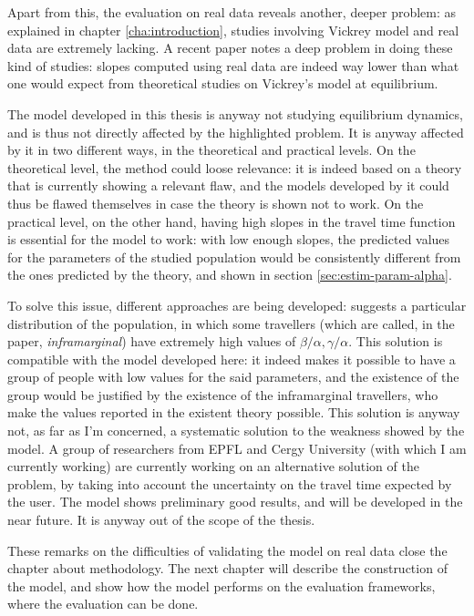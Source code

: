 Apart from this, the evaluation on real data reveals another, deeper problem:
as explained in chapter \ref{cha:introduction},
studies involving Vickrey model and real data are extremely lacking.
A recent paper \parencite{https://doi.org/10.1111/iere.12692} notes a deep problem in doing these kind of studies:
slopes computed using real data are indeed way lower than what one would expect from theoretical studies on Vickrey's model at equilibrium.

The model developed in this thesis is anyway not studying equilibrium dynamics,
and is thus not directly affected by the highlighted problem.
It is anyway affected by it in two different ways, in the theoretical and practical levels.
On the theoretical level, the method could loose relevance:
it is indeed based on a theory that is currently showing a relevant flaw,
and the models developed by it could thus be flawed themselves in case the theory is shown not to work.
On the practical level, on the other hand,
having high slopes in the travel time function is essential for the model to work:
with low enough slopes,
the predicted values for the parameters of the studied population would be consistently different from the ones predicted by the theory, and shown in section \ref{sec:estim-param-alpha}.

To solve this issue, different approaches are being developed:
\textcite{https://doi.org/10.1111/iere.12692} suggests a particular distribution of the population,
in which some travellers (which are called, in the paper, \textit{inframarginal}) have extremely high values of \(\beta/\alpha, \gamma/\alpha\).
This solution is compatible with the model developed here:
it indeed makes it possible to have a group of people with low values for the said parameters,
and the existence of the group would be justified by the existence of the inframarginal travellers,
who make the values reported in the existent theory possible.
This solution is anyway not, as far as I'm concerned,
a systematic solution to the weakness showed by the model.
A group of researchers from EPFL and Cergy University (with which I am currently working) are currently working on an alternative solution of the problem,
by taking into account the uncertainty on the travel time expected by the user.
The model shows preliminary good results, and will be developed in the near future.
It is anyway out of the scope of the thesis.

These remarks on the difficulties of validating the model on real data close the chapter about methodology.
The next chapter will describe the construction of the model,
and show how the model performs on the evaluation frameworks,
where the evaluation can be done.


